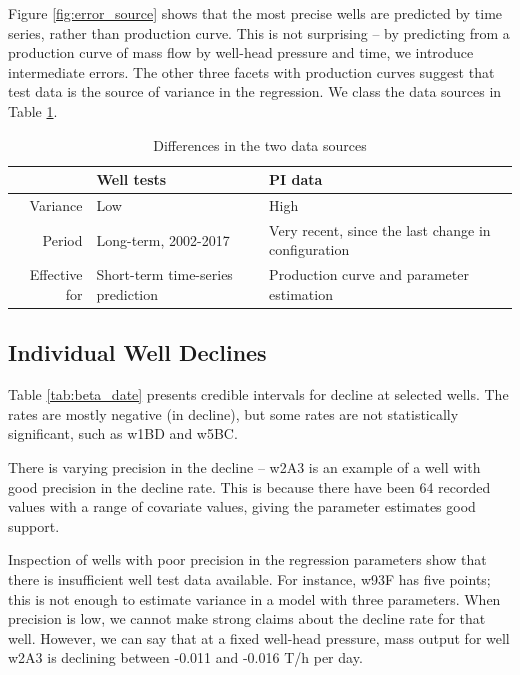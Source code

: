 \documentclass[a4paper, 12pt]{article}
\begin{document}
Figure \ref{fig:error_source} shows that the most precise wells are predicted by time series, rather than production curve. This is not surprising -- by predicting from a production curve of mass flow by well-head pressure and time, we introduce intermediate errors. The other three facets with production curves suggest that test data is the source of variance in the regression. We class the data sources in Table \ref{tab:data_sources}.

\begin{table}
\centering
\begin{tabularx}{0.85\linewidth}{rXX}
\hline
 & Well tests & PI data \\ 
  \hline
Variance & Low & High  \\
Period & Long-term, 2002-2017 & Very recent, since the last change in configuration \\
Effective for & Short-term time-series prediction & Production curve and parameter estimation \\
   \hline
\end{tabularx}
\caption{Differences in the two data sources}
\label{tab:data_sources}
\end{table}

\subsection{Individual Well Declines}



Table \ref{tab:beta_date} presents credible intervals for decline at selected wells. The rates are mostly negative (in decline), but some rates are not statistically significant, such as w1BD and w5BC.

There is varying precision in the decline -- w2A3 is an example of a well with good precision in the decline rate. This is because there have been 64 recorded values with a range of covariate values, giving the parameter estimates good support.

Inspection of wells with poor precision in the regression parameters show that there is insufficient well test data available. For instance, w93F %
has five points; this is not enough to estimate variance in a model with three parameters. When precision is low, we cannot make strong claims about the decline rate for that well. However, we can say that at a fixed well-head pressure, mass output for well w2A3 %
is declining between -0.011 and -0.016 T/h per day.
\end{document}
